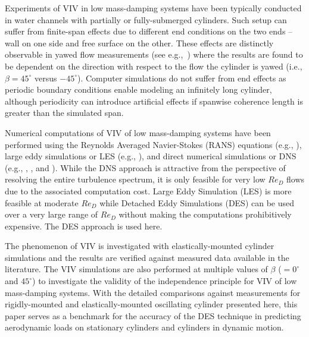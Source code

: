 Experiments of VIV in low mass-damping systems have been typically conducted in
water channels with partially or fully-submerged cylinders. Such setup can
suffer from finite-span effects due to different end conditions on the two ends
-- wall on one side and free surface on the other. These effects are distinctly
observable in yawed flow measurements (see e.g.,~\citet{franzini2013one}) where
the results are found to be dependent on the direction with respect to the flow
the cylinder is yawed (i.e., $\beta=45^\circ$ versus $-45^\circ$). Computer
simulations do not suffer from end effects as periodic boundary conditions
enable modeling an infinitely long cylinder, although periodicity can introduce
artificial effects if spanwise coherence length is greater than the simulated
span.

Numerical computations of VIV of low mass-damping systems have been performed
using the Reynolds Averaged Navier-Stokes (RANS) equations (e.g.,
\citet{guilmineau2004numerical}), large eddy simulations or LES (e.g.,
\citet{al2004vortex}), and direct numerical simulations or DNS (e.g.,
\citet{lucor2005vortex}, \citet{evangelinos2000dns}, and \citet{dong2005dns}).
While the DNS approach is attractive from the perspective of resolving the
entire turbulence spectrum, it is only feasible for very low $Re_D$ flows due
to the associated computation cost. Large Eddy Simulation (LES) is more
feasible at moderate $Re_D$ while Detached Eddy Simulations (DES) can be used
over a very large range of $Re_D$ without making the computations prohibitively
expensive. The DES approach is used here.

The phenomenon of VIV is investigated with elastically-mounted cylinder
simulations and the results are verified against measured data available in the
literature. The VIV simulations are also performed at multiple values of
$\beta$ ($=0^\circ$ and $45^\circ$) to investigate the validity of the
independence principle for VIV of low mass-damping systems. With the detailed
comparisons against measurements for rigidly-mounted and elastically-mounted
oscillating cylinder presented here, this paper serves as a benchmark for the
accuracy of the DES technique in predicting aerodynamic loads on stationary
cylinders and cylinders in dynamic motion.

